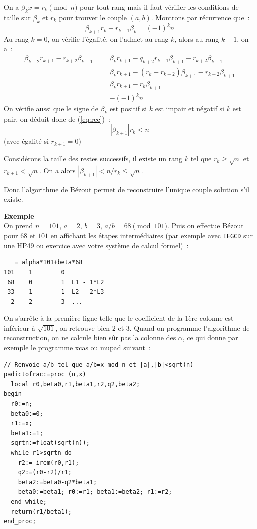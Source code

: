 \documentclass[a4paper,11pt]{article}
\begin{document}
\begin{giacjshere}
On a $ \beta_k x= r_k \pmod n$ pour tout rang mais il faut v\'erifier
les conditions de taille sur $\beta_k$ et $r_k$ pour trouver le couple
$(a,b)$.
Montrons par r\'ecurrence que~:
\begin{equation} \label{eq:rec}
 \beta_{k+1} r_k - r_{k+1} \beta_k = (-1)^k n 
\end{equation}
Au rang $k=0$, on v\'erifie l'\'egalit\'e, on l'admet au rang $k$, 
alors au rang $k+1$, on a~:
\begin{eqnarray*}
 \beta_{k+2} r_{k+1} - r_{k+2} \beta_{k+1} 
& = & \beta_k r_{k+1} - q_{k+2} r_{k+1} \beta_{k+1}  - r_{k+2} \beta_{k+1} \\
& = & \beta_k r_{k+1} - (r_{k}-r_{k+2}) \beta_{k+1}  - r_{k+2} \beta_{k+1} \\
& = & \beta_k r_{k+1} - r_{k} \beta_{k+1} \\
& = & - (-1)^k n
\end{eqnarray*}
On v\'erifie aussi que le signe de $\beta_k$ est positif si $k$ est impair
et n\'egatif si $k$ est pair, on d\'eduit donc de (\ref{eq:rec})~:
\[ |\beta_{k+1}| r_k < n \]
(avec \'egalit\'e si $r_{k+1}=0$)

Consid\'erons la taille des restes successifs, il existe un rang $k$
tel que $r_k \geq \sqrt{n}$ et $r_{k+1}<\sqrt{n}$. On a alors
$|\beta_{k+1}|  < n/r_k \leq \sqrt{n}$.

Donc l'algorithme de Bézout permet de reconstruire l'unique couple
solution s'il existe.

{\bf Exemple}\\
On prend $n=101$, $a=2$, $b=3$, $a/b=68 \pmod {101}$.
Puis on effectue Bézout pour $68$ et $101$ en affichant les étapes 
intermédiaires (par exemple avec \verb|IEGCD| sur une HP49 ou exercice
avec votre système de calcul formel)~:
\begin{verbatim}
   = alpha*101+beta*68
101    1        0
 68    0        1  L1 - 1*L2
 33    1       -1  L2 - 2*L3
  2   -2        3  ...
\end{verbatim}
On s'arrête à la première ligne telle que le coefficient de la 1ère colonne
est inférieur à $\sqrt{101}$, on retrouve bien $2$ et $3$.
Quand on programme l'algorithme de
reconstruction, on ne calcule bien sûr pas la colonne des $\alpha$,
ce qui donne par exemple le programme xcas ou mupad suivant~:
\begin{verbatim}
// Renvoie a/b tel que a/b=x mod n et |a|,|b|<sqrt(n)
padictofrac:=proc (n,x)
  local r0,beta0,r1,beta1,r2,q2,beta2;
begin
  r0:=n;
  beta0:=0;
  r1:=x;
  beta1:=1;
  sqrtn:=float(sqrt(n));
  while r1>sqrtn do
    r2:= irem(r0,r1); 
    q2:=(r0-r2)/r1;
    beta2:=beta0-q2*beta1;
    beta0:=beta1; r0:=r1; beta1:=beta2; r1:=r2;
  end_while;
  return(r1/beta1);
end_proc;
\end{verbatim}



\end{giacjshere}
\end{document}
